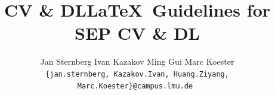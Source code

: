 \documentclass[10pt,twocolumn,letterpaper]{article}
\title{\SEP CV \& DL}
\title{\LaTeX\ Guidelines for SEP CV \& DL}
\author{Jan Sternberg
\quad
Ivan Kazakov
\quad
Ming Gui
\quad
Marc Koester\\
\tt\small\{jan.sternberg, Kazakov.Ivan, Huang.Ziyang, Marc.Koester\}@campus.lmu.de
}
\begin{document}
\maketitle
    


{
    \small
    
    
}

% 
\end{document}
